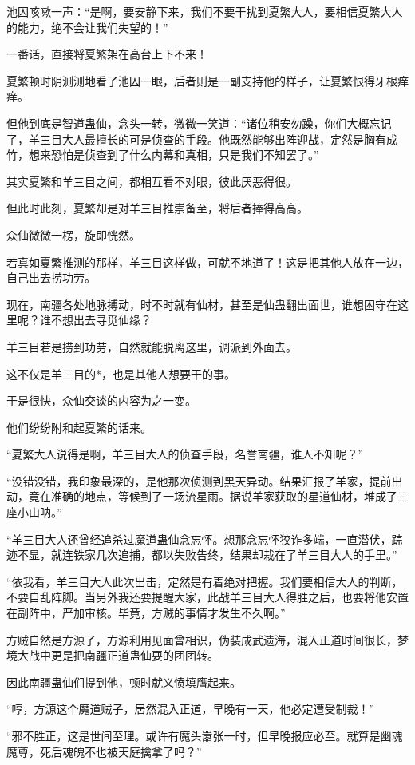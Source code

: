 \begin{this_body}
池囚咳嗽一声：“是啊，要安静下来，我们不要干扰到夏繁大人，要相信夏繁大人的能力，绝不会让我们失望的！”

一番话，直接将夏繁架在高台上下不来！

夏繁顿时阴测测地看了池囚一眼，后者则是一副支持他的样子，让夏繁恨得牙根痒痒。

但他到底是智道蛊仙，念头一转，微微一笑道：“诸位稍安勿躁，你们大概忘记了，羊三目大人最擅长的可是侦查的手段。他既然能够出阵迎战，定然是胸有成竹，想来恐怕是侦查到了什么内幕和真相，只是我们不知罢了。”

其实夏繁和羊三目之间，都相互看不对眼，彼此厌恶得很。

但此时此刻，夏繁却是对羊三目推崇备至，将后者捧得高高。

众仙微微一楞，旋即恍然。

若真如夏繁推测的那样，羊三目这样做，可就不地道了！这是把其他人放在一边，自己出去捞功劳。

现在，南疆各处地脉搏动，时不时就有仙材，甚至是仙蛊翻出面世，谁想困守在这里呢？谁不想出去寻觅仙缘？

羊三目若是捞到功劳，自然就能脱离这里，调派到外面去。

这不仅是羊三目的*，也是其他人想要干的事。

于是很快，众仙交谈的内容为之一变。

他们纷纷附和起夏繁的话来。

“夏繁大人说得是啊，羊三目大人的侦查手段，名誉南疆，谁人不知呢？”

“没错没错，我印象最深的，是他那次侦测到黑天异动。结果汇报了羊家，提前出动，竟在准确的地点，等候到了一场流星雨。据说羊家获取的星道仙材，堆成了三座小山呐。”

“羊三目大人还曾经追杀过魔道蛊仙念忘怀。想那念忘怀狡诈多端，一直潜伏，踪迹不显，就连铁家几次追捕，都以失败告终，结果却栽在了羊三目大人的手里。”

“依我看，羊三目大人此次出击，定然是有着绝对把握。我们要相信大人的判断，不要自乱阵脚。当另外我还要提醒大家，此战羊三目大人得胜之后，也要将他安置在副阵中，严加审核。毕竟，方贼的事情才发生不久啊。”

方贼自然是方源了，方源利用见面曾相识，伪装成武遗海，混入正道时间很长，梦境大战中更是把南疆正道蛊仙耍的团团转。

因此南疆蛊仙们提到他，顿时就义愤填膺起来。

“哼，方源这个魔道贼子，居然混入正道，早晚有一天，他必定遭受制裁！”

“邪不胜正，这是世间至理。或许有魔头嚣张一时，但早晚报应必至。就算是幽魂魔尊，死后魂魄不也被天庭擒拿了吗？”


\end{this_body}
